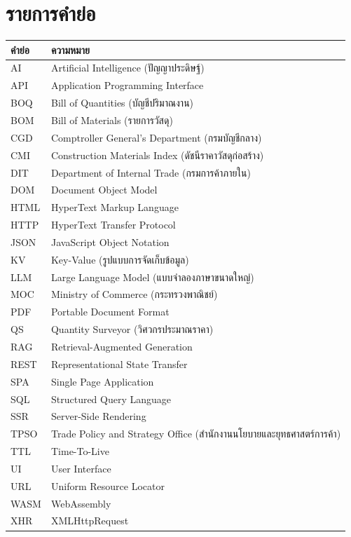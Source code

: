\chapter*{รายการคำย่อ}

\begin{longtable}{lp{11cm}}
\toprule
\textbf{คำย่อ} & \textbf{ความหมาย} \\
\midrule
\endhead
AI      & Artificial Intelligence (ปัญญาประดิษฐ์) \\
API     & Application Programming Interface \\
BOQ     & Bill of Quantities (บัญชีปริมาณงาน) \\
BOM     & Bill of Materials (รายการวัสดุ) \\
CGD     & Comptroller General's Department (กรมบัญชีกลาง) \\
CMI     & Construction Materials Index (ดัชนีราคาวัสดุก่อสร้าง) \\
DIT     & Department of Internal Trade (กรมการค้าภายใน) \\
DOM     & Document Object Model \\
HTML    & HyperText Markup Language \\
HTTP    & HyperText Transfer Protocol \\
JSON    & JavaScript Object Notation \\
KV      & Key-Value (รูปแบบการจัดเก็บข้อมูล) \\
LLM     & Large Language Model (แบบจำลองภาษาขนาดใหญ่) \\
MOC     & Ministry of Commerce (กระทรวงพาณิชย์) \\
PDF     & Portable Document Format \\
QS      & Quantity Surveyor (วิศวกรประมาณราคา) \\
RAG     & Retrieval-Augmented Generation \\
REST    & Representational State Transfer \\
SPA     & Single Page Application \\
SQL     & Structured Query Language \\
SSR     & Server-Side Rendering \\
TPSO    & Trade Policy and Strategy Office (สำนักงานนโยบายและยุทธศาสตร์การค้า) \\
TTL     & Time-To-Live \\
UI      & User Interface \\
URL     & Uniform Resource Locator \\
WASM    & WebAssembly \\
XHR     & XMLHttpRequest \\
\bottomrule
\end{longtable}
